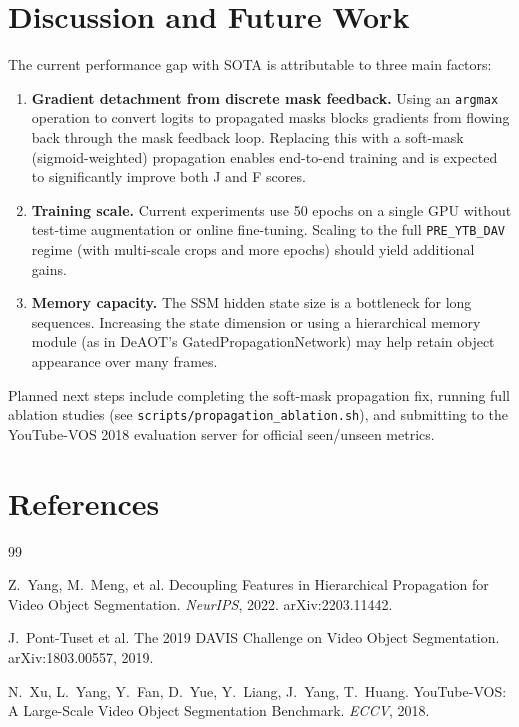 \documentclass[11pt,a4paper]{article}
\begin{document}
\section{Discussion and Future Work}
\label{sec:discussion}

The current performance gap with SOTA is attributable to three main factors:

\begin{enumerate}
  \item \textbf{Gradient detachment from discrete mask feedback.}
        Using an \texttt{argmax} operation to convert logits to propagated masks
        blocks gradients from flowing back through the mask feedback loop.
        Replacing this with a soft-mask (sigmoid-weighted) propagation enables
        end-to-end training and is expected to significantly improve both J and F
        scores.

  \item \textbf{Training scale.}
        Current experiments use 50 epochs on a single GPU without test-time
        augmentation or online fine-tuning.  Scaling to the full
        \texttt{PRE\_YTB\_DAV} regime (with multi-scale crops and more epochs)
        should yield additional gains.

  \item \textbf{Memory capacity.}
        The SSM hidden state size is a bottleneck for long sequences.
        Increasing the state dimension or using a hierarchical memory module
        (as in DeAOT's GatedPropagationNetwork) may help retain object
        appearance over many frames.
\end{enumerate}

Planned next steps include completing the soft-mask propagation fix, running
full ablation studies (see \texttt{scripts/propagation\_ablation.sh}),
and submitting to the YouTube-VOS 2018 evaluation server for official
seen/unseen metrics.

\section*{References}

\begin{thebibliography}{99}

Z.\ Yang, M.\ Meng, et al.
\newblock Decoupling Features in Hierarchical Propagation for Video Object
Segmentation.
\newblock \emph{NeurIPS}, 2022. arXiv:2203.11442.

J.\ Pont-Tuset et al.
\newblock The 2019 DAVIS Challenge on Video Object Segmentation.
\newblock arXiv:1803.00557, 2019.

N.\ Xu, L.\ Yang, Y.\ Fan, D.\ Yue, Y.\ Liang, J.\ Yang, T.\ Huang.
\newblock YouTube-VOS: A Large-Scale Video Object Segmentation Benchmark.
\newblock \emph{ECCV}, 2018.

\end{thebibliography}
\end{document}

